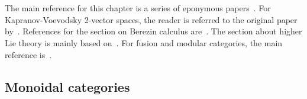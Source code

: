 \chapter{}\label{chapter:hda}

    The main reference for this chapter is a series of eponymous papers~\citep{baez_higher-dimensional_2003, baez_higher-dimensional_2003-1}. For Kapranov-Voevodsky 2-vector spaces, the reader is referred to the original paper by~\citet{kapranov_2-categories_1994}. References for the section on Berezin calculus are~\citet{losev_berezin_2007, choquet-bruhat_analysis_2000}. The section about higher Lie theory is mainly based on~\citet{fiorenza_introduction_2004}. For fusion and modular categories, the main reference is~\citet{etingof_tensor_2016}.

    \minitoc

\section{Monoidal categories}\label{section:monoidal_categories}

